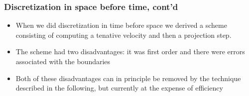 \begin{frame}
\frametitle{Discretization in space before time, cont'd}
\begin{itemize}
\item 
When we did discretization in time before space we derived
a scheme consisting of computing a tenative velocity and
then a projection step. 
\item 
The scheme had two disadvantages: it was \alert{first order} and 
there were \alert{errors associated with the boundaries} 
\item 
Both of these disadvantages can in principle be removed by the technique
described in the following, but currently at the expense of efficiency 
\end{itemize}
\end{frame}
